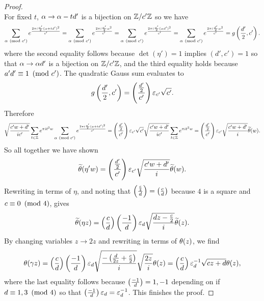\documentclass[12pt,oneside]{book}
\begin{document}
\begin{proof}
\[        \]
        For fixed $t$, $\alpha \to \alpha-td'$ is a bijection on $\mathbb{Z}/c'\mathbb{Z}$ so we have
        \[
          \sum_{\alpha \ \left(\text{mod }c'\right)}e^{\frac{2\pi i\frac{a'}{2}(\alpha+td')^{2}}{c'}} = \sum_{\alpha \ \left(\text{mod }c'\right)}e^{\frac{2\pi i\frac{a'}{2}\alpha^{2}}{c'}} = \sum_{\alpha \ \left(\text{mod }c'\right)}e^{\frac{2\pi i\frac{a'}{2}(\alpha d')^{2}}{c'}} = \sum_{\alpha \ \left(\text{mod }c'\right)}e^{\frac{2\pi i\frac{d'}{2}\alpha^{2}}{c'}} = g\left(\frac{d'}{2},c'\right).
        \]
        where the second equality follows because $\det(\eta') = 1$ implies $(d',c') = 1$ so that $\alpha \to \alpha d'$ is a bijection on $\mathbb{Z}/c'\mathbb{Z}$, and the third equality holds because $a'd' \equiv 1 \ \left(\text{mod }c'\right)$. The quadratic Gauss sum evaluates to
        \[
          g\left(\frac{d'}{2},c'\right) = \left(\frac{\frac{d'}{2}}{c'}\right)\varepsilon_{c'}\sqrt{c'}.
        \]
        Therefore
        \[
          \sqrt{\frac{c'w+d'}{ic'}}\sum_{t \in \mathbb{Z}}e^{\pi it^{2}w}\sum_{\alpha \ \left(\text{mod }c'\right)}e^{\frac{2\pi i\frac{a'}{2}(\alpha+td')^{2}}{c'}} = \left(\frac{\frac{d'}{2}}{c'}\right)\varepsilon_{c'}\sqrt{c'}\sqrt{\frac{c'w+d'}{ic'}}\sum_{t \in \mathbb{Z}}e^{\pi it^{2}w} = \left(\frac{\frac{d'}{2}}{c'}\right)\varepsilon_{c'}\sqrt{\frac{c'w+d'}{i}}\widetilde{\theta}(w).
        \]
        So all together we have shown
        \[
          \widetilde{\theta}(\eta' w) = \left(\frac{\frac{d'}{2}}{c'}\right)\varepsilon_{c'}\sqrt{\frac{c'w+d'}{i}}\widetilde{\theta}(w).
        \]
        Rewriting in terms of $\eta$, and noting that $\left(\frac{\frac{c}{4}}{d}\right) = \left(\frac{c}{d}\right)$ because $4$ is a square and $c \equiv 0 \ \left(\text{mod }4\right)$, gives
        \[
          \widetilde{\theta}(\eta z) = \left(\frac{c}{d}\right)\left(\frac{-1}{d}\right)\varepsilon_{d}\sqrt{\frac{dz-\frac{c}{2}}{i}}\widetilde{\theta}(z).
        \]
        By changing variables $z \to 2z$ and rewriting in terms of $\theta(z)$, we find
        \[
          \theta(\gamma z) = \left(\frac{c}{d}\right)\left(\frac{-1}{d}\right)\varepsilon_{d}\sqrt{\frac{-\left(\frac{d}{2z}+\frac{c}{2}\right)}{i}}\sqrt{\frac{2z}{i}}\theta(z) = \left(\frac{c}{d}\right)\varepsilon_{d}^{-1}\sqrt{cz+d}\theta(z),
        \]
        where the last equality follows because $\left(\frac{-1}{d}\right) = 1,-1$ depending on if $d \equiv 1,3 \ \left(\text{mod }4\right)$ so that $\left(\frac{-1}{d}\right)\varepsilon_{d} = \varepsilon_{d}^{-1}$. This finishes the proof.
      \end{proof}
\end{document}
